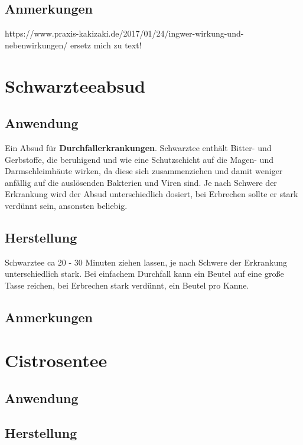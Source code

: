 \subsection{Anmerkungen}

https://www.praxis-kakizaki.de/2017/01/24/ingwer-wirkung-und-nebenwirkungen/
ersetz mich zu text!




\section{Schwarzteeabsud}

\subsection{Anwendung}

Ein Absud für \textbf{Durchfallerkrankungen}. Schwarztee enthält Bitter- und Gerbstoffe, die beruhigend und wie eine Schutzschicht auf die Magen- und Darmschleimhäute wirken, da diese sich zusammenziehen und damit weniger anfällig auf die auslösenden Bakterien und Viren sind. Je nach Schwere der Erkrankung wird der Absud unterschiedlich dosiert, bei Erbrechen sollte er stark verdünnt sein, ansonsten beliebig.

\subsection{Herstellung}

Schwarztee ca 20 - 30 Minuten ziehen lassen, je nach Schwere der Erkrankung unterschiedlich stark. Bei einfachem Durchfall kann ein Beutel auf eine große Tasse reichen, bei Erbrechen stark verdünnt, ein Beutel pro Kanne.

\subsection{Anmerkungen}





\section{Cistrosentee}

\subsection{Anwendung}

\subsection{Herstellung}

